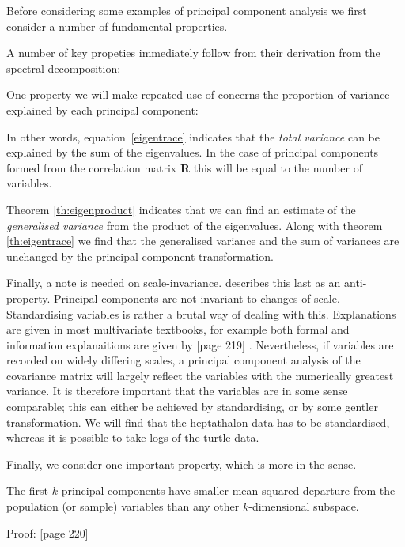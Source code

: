 Before considering some examples of principal component analysis we first consider a number of fundamental properties.



A number of key propeties immediately follow from their derivation from the spectral decomposition:



One property we will make repeated use of concerns the proportion of variance explained by each principal component:



In other words, equation~\ref{eigentrace} indicates that the \emph{total variance} can be explained by the sum of the eigenvalues.   In the case of principal components formed from the correlation matrix $\boldsymbol{R}$ this will be equal to the number of variables.



Theorem \ref{th:eigenproduct} indicates that we can find an estimate of the \emph{generalised variance} from the product of the eigenvalues.   Along with theorem \ref{th:eigentrace} we find that the generalised variance and the sum of variances are unchanged by the principal component transformation.   

Finally, a note is needed on scale-invariance.   \cite{Flury:1997} describes this last as an anti-property.   Principal components are not-invariant to changes of scale.   Standardising variables is rather a brutal way of dealing with this.   Explanations are given in most multivariate textbooks, for example both formal and information explanaitions are given by [page 219] \cite{Mardia+etal:1979}.   Nevertheless, if variables are recorded on widely differing scales, a principal component analysis of the covariance matrix will largely reflect the variables with the numerically greatest variance.   It is therefore important that the variables are in some sense comparable; this can either be achieved by standardising, or by some gentler transformation.   We will find that the heptathalon data has to be standardised, whereas it is possible to take logs of the turtle data.


Finally, we consider one important property, which is more in the \cite{Pearson:1901} sense.   

\begin{theorem}
The first $k$ principal components have smaller mean squared departure from the population (or sample) variables than any other $k$-dimensional subspace.
\end{theorem}
Proof: [page 220] \cite{Mardia+etal:1979}


